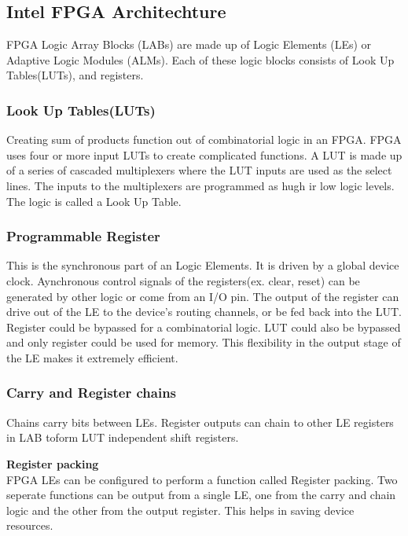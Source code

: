 \subsection{Intel FPGA Architechture}

FPGA Logic Array Blocks (LABs) are made up of Logic Elements (LEs) or Adaptive Logic Modules (ALMs). Each of these logic blocks consists of Look Up Tables(LUTs), and registers.

\subsubsection{Look Up Tables(LUTs)}
Creating sum of products function out of combinatorial logic in an FPGA. FPGA uses four or more input LUTs to create complicated functions. A LUT is made up of a series of cascaded multiplexers where the LUT inputs are used as the select lines. The inputs to the multiplexers are programmed as hugh ir low logic levels. The logic is called a Look Up Table.

\subsubsection{Programmable Register}
This is the synchronous part of an Logic Elements. It is driven by a global device clock. Aynchronous control signals of the registers(ex. clear, reset) can be generated by other logic or come from an I/O pin. The output of the register can drive out of the LE to the device's routing channels, or be fed back into the LUT. Register could be bypassed for a combinatorial logic. LUT could also be bypassed and only register could be used for memory. This flexibility in the output stage of the LE makes it extremely efficient.

\subsubsection{Carry and Register chains}
Chains carry bits between LEs. Register outputs can chain to other LE registers in LAB toform LUT independent shift registers. 

\textbf{Register packing}\\
FPGA LEs can be configured to perform a function called Register packing. Two seperate functions can be output from a single LE, one from the carry and chain logic and the other from the output register. This helps in saving device resources.

